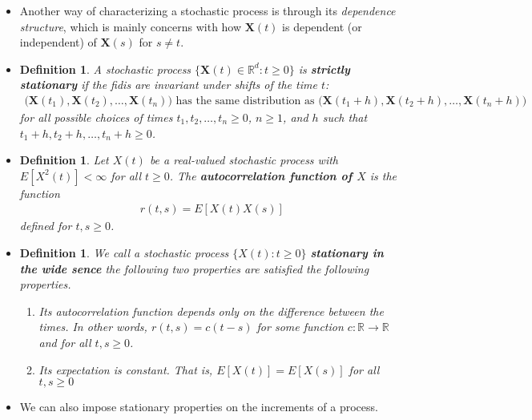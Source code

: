 \documentclass[10pt]{article}
\newtheorem{definition}[lemma]{Definition}
\newcommand{\ve}[1]{\mathbf{#1}}
\newcommand{\Real}{\mathbb{R}}
\begin{document}
\begin{itemize}
  \item Another way of characterizing a stochastic process is through its {\it dependence structure}, which is mainly concerns with how $\ve{X}(t)$ is dependent (or independent) of $\ve{X}(s)$ for $s \neq t$.
  
  \item \begin{definition}
    A stochastic process $\{ \ve{X}(t) \in \Real^d: t \geq 0 \}$ is {\bf strictly stationary} if the fidis are invariant under shifts of the time $t$:
    \begin{align*}
      \big(\ve{X}(t_1), \ve{X}(t_2), \dotsc, \ve{X}(t_n)\big) \mbox{ has the same distribution as }
      \big(\ve{X}(t_1 + h), \ve{X}(t_2 + h), \dotsc, \ve{X}(t_n + h)\big)
    \end{align*}
    for all possible choices of times $t_1, t_2, \dotsc, t_n \geq 0$, $n \geq 1$, and $h$ such that $t_1+h, t_2+h, \dotsc, t_n+h \geq 0$.
  \end{definition}

  \item \begin{definition}
    Let $X(t)$ be a real-valued stochastic process with $E[X^2(t)] < \infty$ for all $t \geq 0$. The {\bf autocorrelation function of $X$} is the function
    \begin{align*}
      r(t,s) = E[X(t)X(s)]
    \end{align*}
    defined for $t, s \geq 0$.
  \end{definition}

  \item \begin{definition}
    We call a stochastic process $\{ X(t) : t \geq 0 \}$ {\bf stationary in the wide sence} the following two properties are satisfied the following properties.
    \begin{enumerate}
      \item Its autocorrelation function depends only on the difference between the times. In other words, $r(t,s) = c(t-s)$ for some function $c: \Real \rightarrow \Real$ and for all $t, s \geq 0$.
      \item Its expectation is constant. That is, $E[X(t)] = E[X(s)]$ for all $t, s \geq 0$
    \end{enumerate}    
  \end{definition}

  \item We can also impose stationary properties on the increments of a process.


\end{itemize}
\end{document}
